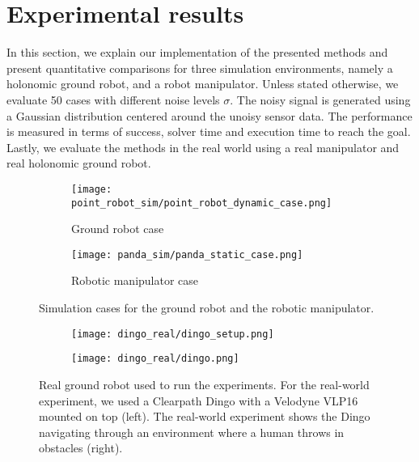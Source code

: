 \section{Experimental results}
\label{sec:results}


In this section, we explain our implementation of the
presented methods and present quantitative
comparisons for three simulation environments, namely a holonomic ground robot,
and a robot manipulator.
Unless stated otherwise, we evaluate
50 cases with different noise levels $\sigma$. The noisy signal is generated
using a Gaussian distribution centered around the unoisy sensor data. 
The performance is measured 
in terms of success, solver time and execution time to reach the goal. Lastly, 
we evaluate the methods in the real world using a real
manipulator and real holonomic ground robot.
%
\begin{figure}
  \begin{subfigure}{0.5\linewidth}
    \texttt{[image: point\_robot\_sim/point\_robot\_dynamic\_case.png]}
    \caption{Ground robot case}
    \label{fig:point_robot_case}
  \end{subfigure}%
  \begin{subfigure}{0.5\linewidth}
    \texttt{[image: panda\_sim/panda\_static\_case.png]}
    \caption{Robotic manipulator case}
    \label{fig:panda_case}
  \end{subfigure}%
  \caption{Simulation cases for the ground robot and the robotic manipulator.}
  \label{fig:simulation_cases}
\end{figure}
%
\begin{figure}
  \begin{subfigure}{0.5\linewidth}
    \texttt{[image: dingo\_real/dingo\_setup.png]}
  \end{subfigure}%
  \begin{subfigure}{0.5\linewidth}
    \texttt{[image: dingo\_real/dingo.png]}
  \end{subfigure}%
  \caption{Real ground robot used to run the experiments.
  For the real-world experiment, we used a Clearpath Dingo
  with a Velodyne VLP16 mounted on top (left). The
  real-world experiment shows the Dingo navigating through
  an environment where a human throws in obstacles (right).
  }
  \label{fig:real_dingo}
\end{figure}
%
